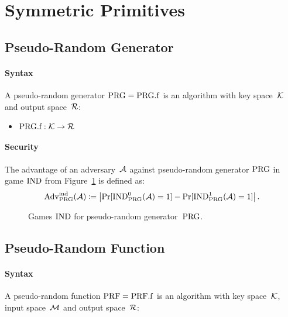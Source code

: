 \documentclass[a4paper,orivec]{llncs}
\begin{document}






\section{Symmetric Primitives}


\subsection{Pseudo-Random Generator}


\paragraph{Syntax}
A pseudo-random generator $\mathrm{PRG}=\mathrm{PRG}.\mathrm{f}$ is an algorithm with key space~$\mathcal{K}$ and output space~$\mathcal{R}$:

\begin{itemize}
    \item $\mathrm{PRG}.\mathrm{f}: \mathcal{K} \to \mathcal{R}$
\end{itemize}

\paragraph{Security}
The advantage of an adversary~$\mathcal{A}$ against pseudo-random generator $\mathrm{PRG}$ in game ${\mathrm{IND}}$ from Figure~\ref{fig:prg:ind} is defined as:
\[
\mathrm{Adv}_{\mathrm{PRG}}^{\mathrm{ind}}(\mathcal{A})\coloneqq\left|\Pr[{\mathrm{IND}}_{\mathrm{PRG}}^0(\mathcal{A})=1]-\Pr[{\mathrm{IND}}_{\mathrm{PRG}}^1(\mathcal{A})=1]\right|\text{.}
\]

\begin{figure}[!ht]
    \centering
    \nicoresetlinenr%
    \fbox{%
        \scalebox{\codescalefactor}{%
        }%
    }
    \caption{%
        Games ${\mathrm{IND}}$ for pseudo-random generator~$\mathrm{PRG}$.
    }
    \label{fig:prg:ind}
\end{figure}

\subsection{Pseudo-Random Function}

\paragraph{Syntax}
A pseudo-random function $\mathrm{PRF}=\mathrm{PRF}.\mathrm{f}$ is an algorithm with key space~$\mathcal{K}$, input space~$\mathcal{M}$ and output space~$\mathcal{R}$:
\end{document}
